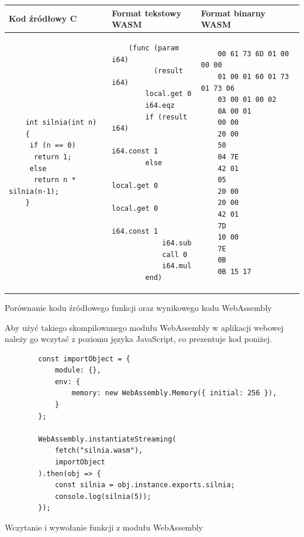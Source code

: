 \documentclass[language=polish,type=master]{aghmodern}
\begin{document}
\begin{listing}[H]
\begin{center}
\begin{tabular}{ |p{}|p{}|p{}| }

\hline
Kod źródłowy C & Format tekstowy WASM & Format binarny WASM \\
\hline

\begin{verbatim}
    int silnia(int n)
    {
     if (n == 0)
      return 1;
     else
      return n * silnia(n-1);
    }
\end{verbatim}

&

\begin{verbatim}
    (func (param i64)
          (result i64)
        local.get 0
        i64.eqz
        if (result i64)
            i64.const 1
        else
            local.get 0
            local.get 0
            i64.const 1
            i64.sub
            call 0
            i64.mul
        end)
\end{verbatim}

&

\begin{verbatim}
    00 61 73 6D 01 00 00 00
    01 00 01 60 01 73 01 73 06
    03 00 01 00 02
    0A 00 01
    00 00
    20 00
    50
    04 7E
    42 01
    05
    20 00
    20 00
    42 01
    7D
    10 00
    7E
    0B
    0B 15 17
\end{verbatim}

\\

\hline

\end{tabular}
\end{center}

\caption{Porównanie kodu źródłowego funkcji oraz wynikowego kodu WebAssembly}
\label{lst:wasm}

\end{listing}

Aby użyć takiego skompilowanego modułu WebAssembly w aplikacji webowej należy go wczytać z poziomu języka JavaScript, co prezentuje kod poniżej.

\begin{listing}[H]
    \begin{verbatim}
        const importObject = {
            module: {},
            env: {
                memory: new WebAssembly.Memory({ initial: 256 }),
            }
        };

        WebAssembly.instantiateStreaming(
            fetch("silnia.wasm"),
            importObject
        ).then(obj => {
            const silnia = obj.instance.exports.silnia;
            console.log(silnia(5));
        });
    \end{verbatim}
    \caption{Wczytanie i wywołanie funkcji z modułu WebAssembly}
\end{listing}
\end{document}
